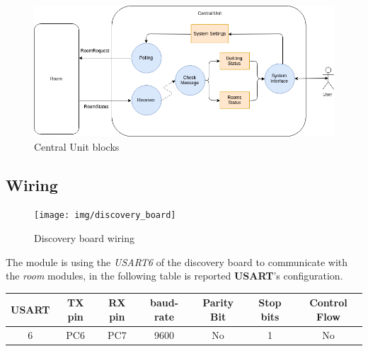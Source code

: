 \begin{figure}[H]
	\centering
	\includegraphics[width=12cm,keepaspectratio]{img/CentralUnit_description}
	\caption{Central Unit blocks}
	\label{fig:centralunit_description}
\end{figure}

\subsection{Wiring}
\begin{figure}[H]
	\centering
	\texttt{[image: img/discovery\_board]}
	\caption{Discovery board wiring}
	\label{fig:dicovery}
\end{figure}

The module is using the \textit{USART6} of the discovery board to communicate with the \textit{room} modules, in the following table is reported \textbf{USART}'s configuration.
\begin{center}
	\begin{tabular}{||c | c | c | c | c | c | c ||} 
		\hline
		USART 	& TX pin 	& RX pin	& baud-rate & Parity Bit & Stop bits & Control Flow \\ 
		\hline
		6		&	PC6		& PC7 		& 9600 & No & 1 & No	\\ 
		\hline
	\end{tabular}
\end{center}

